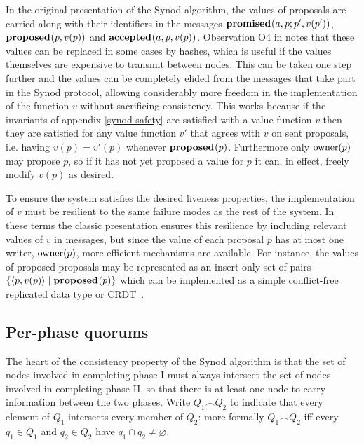 \documentclass[journal]{IEEEtran}
\begin{document}
In the original presentation of the Synod algorithm, the values of proposals
are carried along with their identifiers in the messages $\mathbf{promised}_{}(a,p;
p',v(p') )$, $\mathbf{proposed}_{}( p,v(p))$ and $\mathbf{accepted}_{}(a, p,v(p) )$. Observation O4 in
\cite{cheap-paxos} notes that these values can be replaced in some cases by
hashes, which is useful if the values themselves are expensive to transmit
between nodes. This can be taken one step further and the values can be
completely elided from the messages that take part in the Synod protocol,
allowing considerably more freedom in the implementation of the function $v$
without sacrificing consistency.  This works because if the invariants of
appendix \ref{synod-safety} are satisfied with a value function $v$ then they
are satisfied for any value function $v'$ that agrees with $v$ on sent
proposals, i.e. having $v(p) = v'(p)$ whenever $\mathbf{proposed}_{}(p)$.  Furthermore only
$\mathrm{owner}(p)$ may propose $p$, so if it has not yet proposed a value for $p$ it
can, in effect, freely modify $v(p)$ as desired.

To ensure the system satisfies the desired liveness properties, the
implementation of $v$ must be resilient to the same failure modes as the rest
of the system. In these terms the classic presentation ensures this resilience
by including relevant values of $v$ in messages, but since the value of each
proposal $p$ has at most one writer, $\mathrm{owner}(p)$, more efficient mechanisms are
available. For instance, the values of proposed proposals may be represented as
an insert-only set of pairs $\{ \langle p, v(p) \rangle \mid \mathbf{proposed}_{}(p) \}$
which can be implemented as a simple conflict-free replicated data type or
CRDT~\cite{crdts}.

\subsection{Per-phase quorums}\label{per-phase-quorums}

The heart of the consistency property of the Synod algorithm is that the set of
nodes involved in completing phase I must always intersect the set of nodes
involved in completing phase II, so that there is at least one node to carry
information between the two phases. Write $Q_1 \frown Q_2$ to indicate that
every element of $Q_1$ intersects every member of $Q_2$: more formally $Q_1
\frown Q_2$ iff every $q_1 \in Q_1$ and $q_2 \in Q_2$ have ${q_1 \cap q_2 \ne
\varnothing}$.
\end{document}
